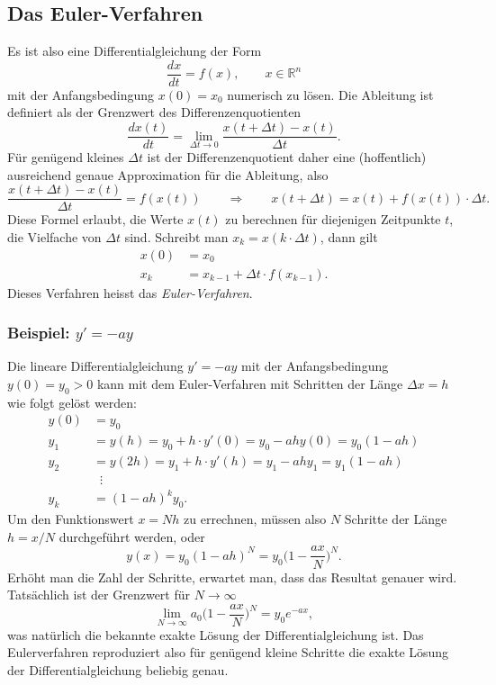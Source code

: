 %
%
%
\subsection{Das Euler-Verfahren\label{subsection:euler}}
Es ist also eine Differentialgleichung der Form
\[
\frac{dx}{dt} = f(x),\qquad x\in\mathbb R^n
\]
mit der Anfangsbedingung $x(0)=x_0$ numerisch zu lösen.
Die Ableitung ist definiert als der Grenzwert des Differenzenquotienten
\[
\frac{dx(t)}{dt}
=
\lim_{\Delta t\to 0}
\frac{x(t+\Delta t)-x(t)}{\Delta t}.
\]
Für genügend kleines $\Delta t$ ist der Differenzenquotient daher eine
(hoffentlich) ausreichend genaue Approximation für die Ableitung,
also
\begin{equation}
\frac{x(t+\Delta t)-x(t)}{\Delta t} = f(x(t))
\qquad\Rightarrow\qquad
x(t+\Delta t) = x(t) + f(x(t))\cdot \Delta t.
\label{skript:euler:differenzenquotient}
\end{equation}
Diese Formel erlaubt, die Werte $x(t)$ zu berechnen für diejenigen
Zeitpunkte $t$, die Vielfache von $\Delta t$ sind.
Schreibt man $x_k = x(k\cdot \Delta t)$, dann gilt
\begin{align*}
x(0) &= x_0\\
x_k &= x_{k-1} + \Delta t \cdot f(x_{k-1}).
\end{align*}
Dieses Verfahren heisst das {\em Euler-Verfahren}.
%

\subsubsection{Beispiel: $y'=-ay$}
Die lineare Differentialgleichung $y'=-ay$ mit der Anfangsbedingung 
$y(0)=y_0 > 0$ kann mit dem Euler-Verfahren mit Schritten der Länge $\Delta x=h$
wie folgt gelöst werden:
\begin{align*}
y(0)&=y_0\\
y_1&=y(h) = y_0 + h\cdot y'(0) = y_0  -ah y(0) = y_0(1 - ah)
\\
y_2&=y(2h) = y_1 + h\cdot y'(h) = y_1  -ah y_1 = y_1(1-ah)
\\
&\;\;\vdots
\\
y_k&= (1-ah)^k y_0.
\end{align*}
Um den Funktionswert $x=Nh$ zu errechnen, müssen also $N$ Schritte der
Länge $h=x/N$ durchgeführt werden, oder
\[
y(x) = y_0(1-ah)^N =
y_0
\biggl(
1-\frac{ax}{N}
\biggr)^N.
\]
Erhöht man die Zahl der Schritte, erwartet man, dass das Resultat genauer
wird.
Tatsächlich ist der Grenzwert für $N\to\infty$
\[
\lim_{N\to\infty} a_0\biggl(1-\frac{ax}{N}\biggr)^N
=
y_0
e^{-ax},
\]
was natürlich die bekannte exakte Lösung der Differentialgleichung ist.
Das Eulerverfahren reproduziert also für genügend kleine Schritte 
die exakte Lösung der Differentialgleichung beliebig genau.

